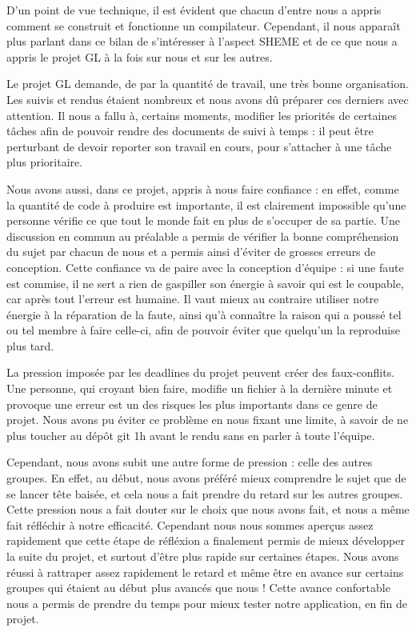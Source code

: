 \documentclass[11pt]{article}
\begin{document}
D'un point de vue technique, il est évident que chacun d'entre nous a appris comment se construit et fonctionne un compilateur.
Cependant, il nous apparaît plus parlant dans ce bilan de s'intéresser à l'aspect SHEME et de ce que nous a appris le projet GL à la fois sur nous et sur les autres. 

Le projet GL demande, de par la quantité de travail, une très bonne organisation. Les suivis et rendus étaient nombreux et nous avons dû préparer ces derniers avec attention. Il nous a fallu à, certains moments, modifier les priorités de certaines tâches afin de pouvoir rendre des documents de suivi à temps : il peut être perturbant de devoir reporter son travail en cours, pour s'attacher à une tâche plus prioritaire. 

Nous avons aussi, dans ce projet, appris à nous faire confiance : en effet, comme la quantité de code à produire est importante, il est clairement impossible qu'une personne vérifie ce que tout le monde fait en plus de s'occuper de sa partie. Une discussion en commun au préalable a permis de vérifier la bonne compréhension du sujet par chacun de nous et a permis ainsi d'éviter de grosses erreurs de conception.
Cette confiance va de paire avec la conception d'équipe : si une faute est commise, il ne sert a rien de gaspiller son énergie à savoir qui est le coupable, car après tout l'erreur est humaine. Il vaut mieux au contraire utiliser notre énergie à la réparation de la faute, ainsi qu'à connaître la raison qui a poussé tel ou tel membre à faire celle-ci, afin de pouvoir éviter que quelqu'un la reproduise plus tard.

La pression imposée par les deadlines du projet peuvent créer des faux-conflits. Une personne, qui croyant bien faire, modifie un fichier à la dernière minute et provoque une erreur est un des risques les plus importants dans ce genre de projet. Nous avons pu éviter ce problème en nous fixant une limite, à savoir de ne plus toucher au dépôt git 1h avant le rendu sans en parler à toute l'équipe. 

Cependant, nous avons subit une autre forme de pression : celle des autres groupes. En effet, au début, nous avons préféré mieux comprendre le sujet que de se lancer tête baisée, et cela nous a fait prendre du retard sur les autres groupes. Cette pression nous a fait douter sur le choix que nous avons fait, et nous a même fait réfléchir à notre efficacité. Cependant nous nous sommes aperçus assez rapidement que cette étape de réfléxion a finalement permis de mieux développer la suite du projet, et surtout d'être plus rapide sur certaines étapes. Nous avons réussi à rattraper assez rapidement le retard et même être en avance sur certains groupes qui étaient au début plus avancés que nous ! Cette avance confortable nous a permis de prendre du temps pour mieux tester notre application, en fin de projet. 
\end{document}
